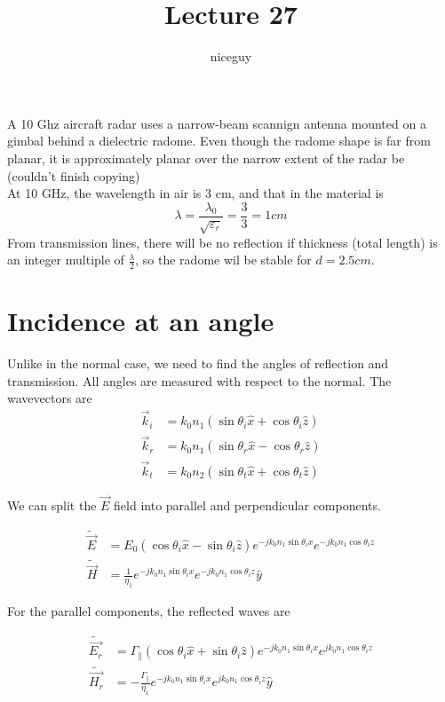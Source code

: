\documentclass[12pt]{article}
\title{Lecture 27}
\author{niceguy}
\begin{document}
\maketitle

\begin{ex}
    A 10 Ghz aircraft radar uses a narrow-beam scannign antenna mounted on a gimbal behind a dielectric radome. Even though the radome shape is far from planar, it is approximately planar over the narrow extent of the radar be (couldn't finish copying) \\
    At 10 GHz, the wavelength in air is 3 cm, and that in the material is
    $$\lambda = \frac{\lambda_0}{\sqrt{\varepsilon_r}} = \frac{3}{3} = 1\unit{cm}$$
    From transmission lines, there will be no reflection if thickness (total length) is an integer multiple of $\frac{\lambda}{2}$, so the radome wil be stable for $d = 2.5\unit{cm}$.
\end{ex}

\section{Incidence at an angle}

Unlike in the normal case, we need to find the angles of reflection and transmission. All angles are measured with respect to the normal. The wavevectors are
\begin{align*}
    \vec k_i &= k_0n_1(\sin\theta_i\hat x + \cos\theta_i \hat z) \\
    \vec k_r &= k_0n_1(\sin\theta_r\hat x - \cos\theta_r \hat z) \\
    \vec k_t &= k_0n_2(\sin\theta_t\hat x + \cos\theta_t\hat z)
\end{align*}

We can split the $\vec E$ field into parallel and perpendicular components.

\begin{align*}
    \tilde{\vec E} &= E_0(\cos\theta_i \hat x - \sin\theta_i \hat z)e^{-jk_0n_1\sin\theta_ix}e^{-jk_0n_1\cos\theta_iz} \\
    \tilde{\vec H} &= \frac{1}{\eta_1} e^{-jk_0n_1\sin\theta_ix}e^{-jk_0n_1\cos\theta_iz} \hat y
\end{align*}

For the parallel components, the reflected waves are

\begin{align*}
    \tilde{\vec{E_r}} &= \Gamma_\parallel (\cos\theta_i\hat x + \sin\theta_i\hat z)e^{-jk_0n_1\sin\theta_i x}e^{jk_0n_1\cos\theta_iz} \\
    \tilde{\vec{H_r}} &= -\frac{\Gamma_\parallel}{\eta_1} e^{-jk_0n_1\sin\theta_ix}e^{jk_0n_1\cos\theta_iz} \hat y
\end{align*}
\end{document}
